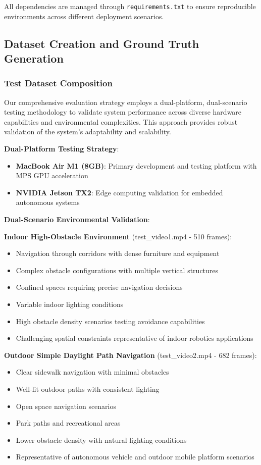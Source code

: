 \documentclass[12pt,oneside]{book}
\begin{document}
All dependencies are managed through \texttt{requirements.txt} to ensure reproducible environments across different deployment scenarios.

\subsection{Dataset Creation and Ground Truth Generation}

\subsubsection{Test Dataset Composition}

Our comprehensive evaluation strategy employs a dual-platform, dual-scenario testing methodology to validate system performance across diverse hardware capabilities and environmental complexities. This approach provides robust validation of the system's adaptability and scalability.

\textbf{Dual-Platform Testing Strategy}:
\begin{itemize}
\item \textbf{MacBook Air M1 (8GB)}: Primary development and testing platform with MPS GPU acceleration
\item \textbf{NVIDIA Jetson TX2}: Edge computing validation for embedded autonomous systems
\end{itemize}

\textbf{Dual-Scenario Environmental Validation}:

\textbf{Indoor High-Obstacle Environment} (test\_video1.mp4 - 510 frames):
\begin{itemize}
\item Navigation through corridors with dense furniture and equipment
\item Complex obstacle configurations with multiple vertical structures
\item Confined spaces requiring precise navigation decisions
\item Variable indoor lighting conditions
\item High obstacle density scenarios testing avoidance capabilities
\item Challenging spatial constraints representative of indoor robotics applications
\end{itemize}

\textbf{Outdoor Simple Daylight Path Navigation} (test\_video2.mp4 - 682 frames):
\begin{itemize}
\item Clear sidewalk navigation with minimal obstacles
\item Well-lit outdoor paths with consistent lighting
\item Open space navigation scenarios
\item Park paths and recreational areas
\item Lower obstacle density with natural lighting conditions
\item Representative of autonomous vehicle and outdoor mobile platform scenarios
\end{itemize}
\end{document}
